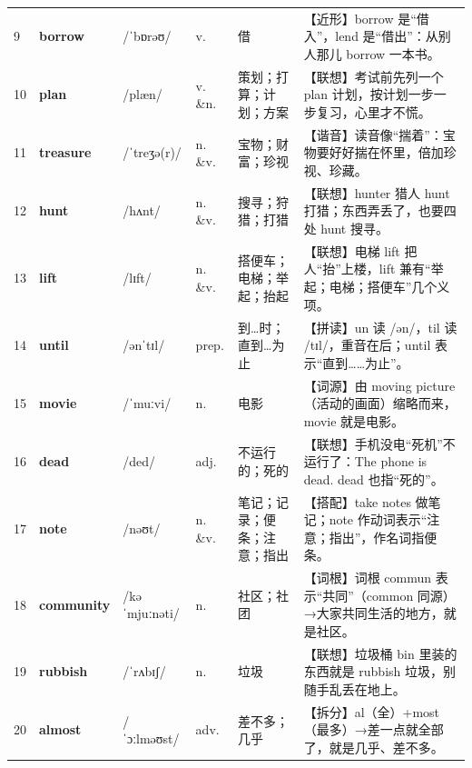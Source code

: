 \documentclass[UTF8,a4paper,11pt,oneside]{ctexbook}
\newcommand{\cellword}[1]{{\bfseries\textcolor{wordcol}{#1}}}
\newcommand{\cellipa}[1]{{\footnotesize\textcolor{ipacol}{#1}}}
\newcommand{\cellpos}[1]{\textcolor{poscol}{#1}}
\newcommand{\cellno}[1]{\textcolor{volcolor!75!black}{#1}}
\begin{document}
{\begin{longtable}{@{}C{0.045\textwidth}L{0.155\textwidth}L{0.175\textwidth}C{0.070\textwidth}L{0.180\textwidth}L{0.282\textwidth}@{}}
 \cellno{9} & \cellword{borrow} & \cellipa{/ˈbɒrəʊ/} & \cellpos{v.} & 借 & \textcolor{tagNear}{【近形】}borrow 是“借入”，lend 是“借出”：从别人那儿 borrow 一本书。 \\
\cellno{10} & \cellword{plan} & \cellipa{/plæn/} & \cellpos{v. \&n.} & 策划；打算；计划；方案 & \textcolor{tagAssoc}{【联想】}考试前先列一个 plan 计划，按计划一步一步复习，心里才不慌。 \\
 \cellno{11} & \cellword{treasure} & \cellipa{/ˈtreʒə(r)/} & \cellpos{n. \&v.} & 宝物；财富；珍视 & \textcolor{tagSound}{【谐音】}读音像“揣着”：宝物要好好揣在怀里，倍加珍视、珍藏。 \\
\cellno{12} & \cellword{hunt} & \cellipa{/hʌnt/} & \cellpos{n. \&v.} & 搜寻；狩猎；打猎 & \textcolor{tagAssoc}{【联想】}hunter 猎人 hunt 打猎；东西弄丢了，也要四处 hunt 搜寻。 \\
 \cellno{13} & \cellword{lift} & \cellipa{/lɪft/} & \cellpos{n. \&v.} & 搭便车；电梯；举起；抬起 & \textcolor{tagAssoc}{【联想】}电梯 lift 把人“抬”上楼，lift 兼有“举起；电梯；搭便车”几个义项。 \\
\cellno{14} & \cellword{until} & \cellipa{/ənˈtɪl/} & \cellpos{prep.} & 到…时；直到…为止 & \textcolor{tagSpell}{【拼读】}un 读 /ən/，til 读 /tɪl/，重音在后；until 表示“直到……为止”。 \\
 \cellno{15} & \cellword{movie} & \cellipa{/ˈmuːvi/} & \cellpos{n.} & 电影 & \textcolor{tagEtym}{【词源】}由 moving picture（活动的画面）缩略而来，movie 就是电影。 \\
\cellno{16} & \cellword{dead} & \cellipa{/ded/} & \cellpos{adj.} & 不运行的；死的 & \textcolor{tagAssoc}{【联想】}手机没电“死机”不运行了：The phone is dead. dead 也指“死的”。 \\
 \cellno{17} & \cellword{note} & \cellipa{/nəʊt/} & \cellpos{n. \&v.} & 笔记；记录；便条；注意；指出 & \textcolor{tagColloc}{【搭配】}take notes 做笔记；note 作动词表示“注意；指出”，作名词指便条。 \\
\cellno{18} & \cellword{community} & \cellipa{/kəˈmjuːnəti/} & \cellpos{n.} & 社区；社团 & \textcolor{tagRoot}{【词根】}词根 commun 表示“共同”（common 同源）→\allowbreak{}大家共同生活的地方，就是社区。 \\
 \cellno{19} & \cellword{rubbish} & \cellipa{/ˈrʌbɪʃ/} & \cellpos{n.} & 垃圾 & \textcolor{tagAssoc}{【联想】}垃圾桶 bin 里装的东西就是 rubbish 垃圾，别随手乱丢在地上。 \\
\cellno{20} & \cellword{almost} & \cellipa{/ˈɔːlməʊst/} & \cellpos{adv.} & 差不多；几乎 & \textcolor{tagSplit}{【拆分】}al（全）+most（最多）→\allowbreak{}差一点就全部了，就是几乎、差不多。 \\

\end{longtable}}
\end{document}

